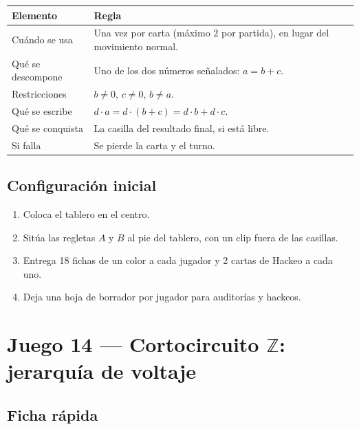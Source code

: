 \documentclass[12pt, letterpaper]{article}
\newcommand{\Z}{\mathbb{Z}}
\begin{document}
\begin{center}
\small
\begin{tabular}{@{}l p{10cm}@{}}
\toprule
\textbf{Elemento} & \textbf{Regla}\\
\midrule
Cuándo se usa & Una vez por carta (máximo 2 por partida), en lugar del movimiento normal.\\
Qué se descompone & Uno de los dos números señalados: $a=b+c$.\\
Restricciones & $b\ne 0$, $c\ne 0$, $b\ne a$.\\
Qué se escribe & $d\cdot a=d\cdot(b+c)=d\cdot b+d\cdot c$.\\
Qué se conquista & La casilla del resultado final, si está libre.\\
Si falla & Se pierde la carta y el turno.\\
\bottomrule
\end{tabular}
\end{center}

\subsection{Configuración inicial}

\begin{enumerate}[leftmargin=*]
  \item Coloca el tablero en el centro.
  \item Sitúa las regletas $A$ y $B$ al pie del tablero, con un clip fuera de las casillas.
  \item Entrega 18 fichas de un color a cada jugador y 2 cartas de Hackeo a cada uno.
  \item Deja una hoja de borrador por jugador para auditorías y hackeos.
\end{enumerate}

\clearpage
\section{Juego 14 — Cortocircuito $\Z$: jerarquía de voltaje}

\subsection{Ficha rápida}
\end{document}
